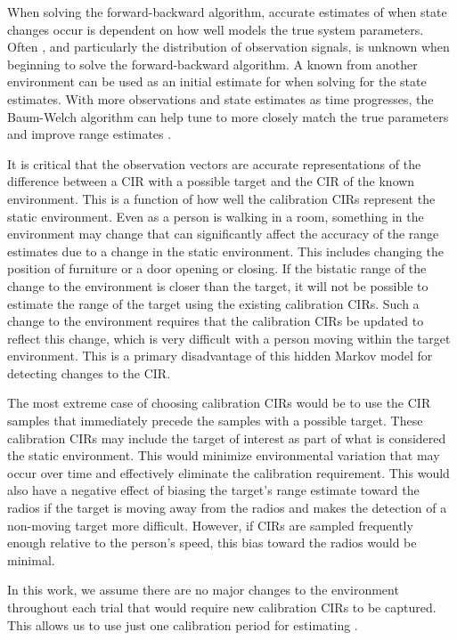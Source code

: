 \documentclass[conference]{IEEEtran}
\begin{document}
When solving the forward-backward algorithm, accurate estimates of
when state changes occur is dependent on how well  models the
true system parameters. Often , and particularly the
distribution of observation signals, is unknown when beginning to
solve the forward-backward algorithm. A known  from another
environment can be used as an initial estimate for  when
solving for the state estimates. With more observations and state
estimates as time progresses, the Baum-Welch algorithm can help tune
 to more closely match the true parameters and improve range
estimates \cite{Rabiner, McCracken}.

It is critical that the observation vectors are accurate
representations of the difference between a CIR with a possible target
and the CIR of the known environment. This is a function of how well
the calibration CIRs represent the static environment. Even as a
person is walking in a room, something in the environment may change
that can significantly affect the accuracy of the range estimates due
to a change in the static environment. This includes changing the
position of furniture or a door opening or closing. If the bistatic
range of the change to the environment is closer than the target, it
will not be possible to estimate the range of the target using the
existing calibration CIRs. Such a change to the environment requires
that the calibration CIRs be updated to reflect this change, which is
very difficult with a person moving within the target
environment. This is a primary disadvantage of this hidden Markov
model for detecting changes to the CIR.

The most extreme case of choosing calibration CIRs would be to use the
CIR samples that immediately precede the samples with a possible
target. These calibration CIRs may include the target of interest as
part of what is considered the static environment. This would minimize
environmental variation that may occur over time and effectively
eliminate the calibration requirement. This would also have a negative
effect of biasing the target's range estimate toward the radios if the
target is moving away from the radios and makes the detection of a
non-moving target more difficult. However, if CIRs are sampled
frequently enough relative to the person's speed, this bias toward the
radios would be minimal.

In this work, we assume there are no major changes to the environment
throughout each trial that would require new calibration CIRs to be
captured. This allows us to use just one calibration period for
estimating .
\end{document}
